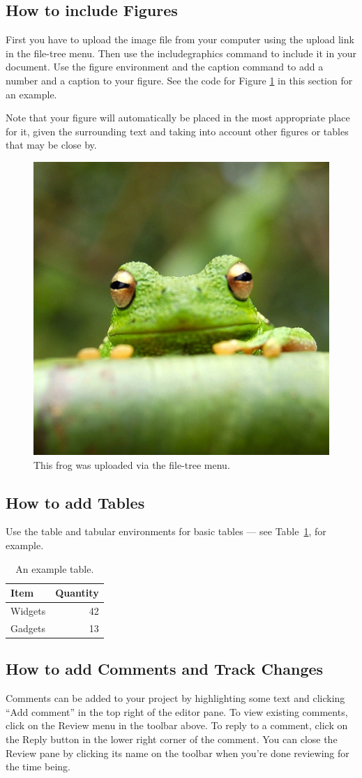 \documentclass{article}
\begin{document}
\subsection{How to include Figures}

First you have to upload the image file from your computer using the upload link in the file-tree menu. Then use the includegraphics command to include it in your document. Use the figure environment and the caption command to add a number and a caption to your figure. See the code for Figure \ref{fig:frog} in this section for an example.

Note that your figure will automatically be placed in the most appropriate place for it, given the surrounding text and taking into account other figures or tables that may be close by.

\begin{figure}
\centering
\includegraphics[width=0.25\linewidth]{frog.jpg}
\caption{\label{fig:frog}This frog was uploaded via the file-tree menu.}
\end{figure}

\subsection{How to add Tables}

Use the table and tabular environments for basic tables --- see Table~\ref{tab:widgets}, for example.

\begin{table}
\centering
\begin{tabular}{l|r}
Item & Quantity \\\hline
Widgets & 42 \\
Gadgets & 13
\end{tabular}
\caption{\label{tab:widgets}An example table.}
\end{table}

\subsection{How to add Comments and Track Changes}

Comments can be added to your project by highlighting some text and clicking ``Add comment'' in the top right of the editor pane. To view existing comments, click on the Review menu in the toolbar above. To reply to a comment, click on the Reply button in the lower right corner of the comment. You can close the Review pane by clicking its name on the toolbar when you're done reviewing for the time being.
\end{document}
